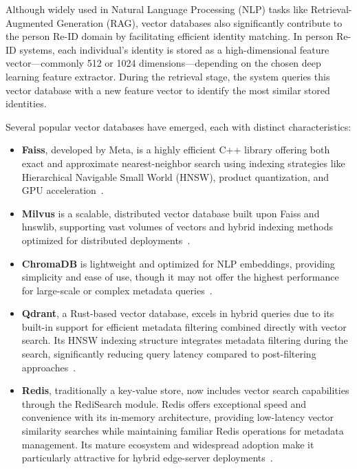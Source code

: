 \documentclass[../main.tex]{subfiles}
\begin{document}
Although widely used in Natural Language Processing (NLP) tasks like Retrieval-Augmented Generation (RAG), vector databases also significantly contribute to the person Re-ID domain by facilitating efficient identity matching. In person Re-ID systems, each individual's identity is stored as a high-dimensional feature vector—commonly 512 or 1024 dimensions—depending on the chosen deep learning feature extractor. During the retrieval stage, the system queries this vector database with a new feature vector to identify the most similar stored identities.

Several popular vector databases have emerged, each with distinct characteristics:

\begin{itemize}
  \item \textbf{Faiss}, developed by Meta, is a highly efficient C++ library offering both exact and approximate nearest-neighbor search using indexing strategies like Hierarchical Navigable Small World (HNSW), product quantization, and GPU acceleration~\cite{faiss}.
  
  \item \textbf{Milvus} is a scalable, distributed vector database built upon Faiss and hnswlib, supporting vast volumes of vectors and hybrid indexing methods optimized for distributed deployments~\cite{milvus}.
  
  \item \textbf{ChromaDB} is lightweight and optimized for NLP embeddings, providing simplicity and ease of use, though it may not offer the highest performance for large-scale or complex metadata queries~\cite{chromadb}.
  
  \item \textbf{Qdrant}, a Rust-based vector database, excels in hybrid queries due to its built-in support for efficient metadata filtering combined directly with vector search. Its HNSW indexing structure integrates metadata filtering during the search, significantly reducing query latency compared to post-filtering approaches~\cite{qdrant}.
  
  \item \textbf{Redis}, traditionally a key-value store, now includes vector search capabilities through the RediSearch module. Redis offers exceptional speed and convenience with its in-memory architecture, providing low-latency vector similarity searches while maintaining familiar Redis operations for metadata management. Its mature ecosystem and widespread adoption make it particularly attractive for hybrid edge-server deployments~\cite{redis_vector}.
  
  
\end{itemize}
\end{document}
